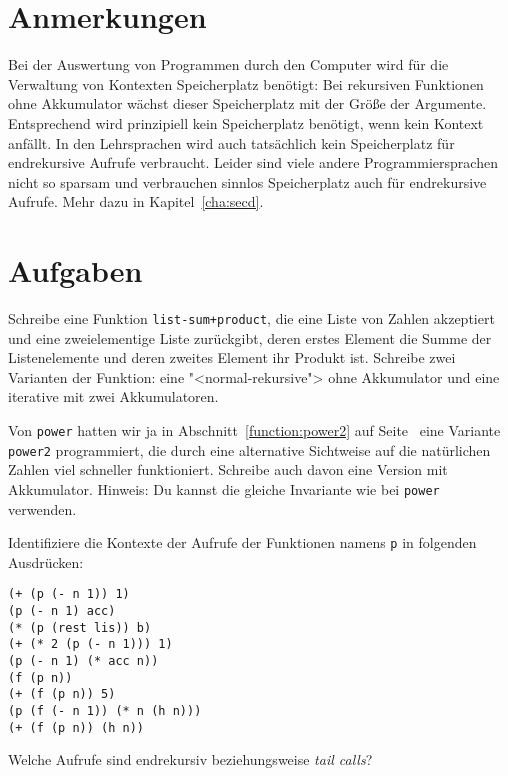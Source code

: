 \section*{Anmerkungen}

Bei der Auswertung von Programmen durch den Computer wird für die
Verwaltung von Kontexten Speicherplatz benötigt: Bei rekursiven
Funktionen ohne Akkumulator wächst dieser Speicherplatz mit der Größe
der Argumente.  Entsprechend wird prinzipiell kein Speicherplatz
benötigt, wenn kein Kontext anfällt.  In den Lehrsprachen wird auch tatsächlich
kein Speicherplatz für endrekursive Aufrufe verbraucht.
Leider sind viele andere Programmiersprachen nicht so sparsam und
verbrauchen sinnlos Speicherplatz auch für endrekursive Aufrufe.
Mehr dazu in Kapitel~\ref{cha:secd}.

\section*{Aufgaben}

\begin{aufgabe}
  Schreibe eine Funktion \texttt{list-sum+product}, die eine
  Liste von Zahlen akzeptiert und eine zweielementige Liste
  zurückgibt, deren erstes Element die Summe der Listenelemente und
  deren zweites Element ihr Produkt ist.  Schreibe zwei Varianten
  der Funktion: eine "<normal-rekursive"> ohne Akkumulator und eine
  iterative mit zwei Akkumulatoren.
\end{aufgabe}

\begin{aufgabe}
  Von \lstinline{power} hatten wir ja in
  Abschnitt~\ref{function:power2} auf Seite~\pageref{function:power2}
  eine Variante \lstinline{power2} programmiert, die durch eine
  alternative Sichtweise auf die natürlichen Zahlen viel schneller
  funktioniert.  Schreibe auch davon eine Version mit Akkumulator.
  Hinweis: Du kannst die gleiche Invariante wie bei \lstinline{power}
  verwenden.
\end{aufgabe}

\begin{aufgabe}
  Identifiziere die Kontexte der Aufrufe der Funktionen namens
  \texttt{p} in folgenden Ausdrücken:
  
\begin{lstlisting}
(+ (p (- n 1)) 1)
(p (- n 1) acc)
(* (p (rest lis)) b)
(+ (* 2 (p (- n 1))) 1)
(p (- n 1) (* acc n))
(f (p n))
(+ (f (p n)) 5)
(p (f (- n 1)) (* n (h n))) 
(+ (f (p n)) (h n))
\end{lstlisting}
  Welche Aufrufe sind endrekursiv beziehungsweise \textit{tail calls}?
\end{aufgabe}

